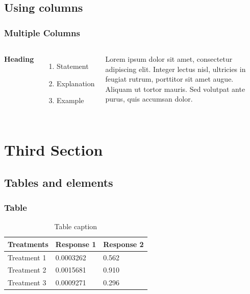 \documentclass[aspectratio=169]{beamer}
\begin{document}

\subsection{Using columns}


\begin{frame}
\frametitle{Multiple Columns}
\begin{columns}[c] %

\textbf{Heading}
\begin{enumerate}
\item Statement
\item Explanation
\item Example
\end{enumerate}

Lorem ipsum dolor sit amet, consectetur adipiscing elit. Integer lectus nisl, ultricies in feugiat rutrum, porttitor sit amet augue. Aliquam ut tortor mauris. Sed volutpat ante purus, quis accumsan dolor.

\end{columns}
\end{frame}

\section{Third Section}
\subsection{Tables and elements}

\begin{frame}
\frametitle{Table}
\begin{table}[H] %
\begin{tabular}{l l l} \hline
\textbf{Treatments} & \textbf{Response 1} & \textbf{Response 2}\\ \hline \hline
Treatment 1 & 0.0003262 & 0.562 \\
Treatment 2 & 0.0015681 & 0.910 \\
Treatment 3 & 0.0009271 & 0.296 \\ \hline
\end{tabular}
\caption{Table caption}
\end{table}

\end{frame}
\end{document}
